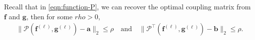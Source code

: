 \begin{remark}
  Recall that in \cref{eqn:function-P}, we can recover the optimal coupling matrix from $\mathbf{f}$ and $\mathbf{g}$,
  then for some $rho > 0$,
  \begin{equation*}
    \begin{aligned}
      \lVert
      \mathcal{P}\left(\mathbf{f}^{(\ell)}, \mathbf{g}^{(\ell)}\right) - \mathbf{a}
      \rVert_2 \le \rho
      \quad\text{and}\quad
      \lVert
      \mathcal{P}^\top \left(\mathbf{f}^{(\ell)}, \mathbf{g}^{(\ell)}\right) - \mathbf{b}
      \rVert_2 \le \rho.
    \end{aligned}
  \end{equation*}
\end{remark}
